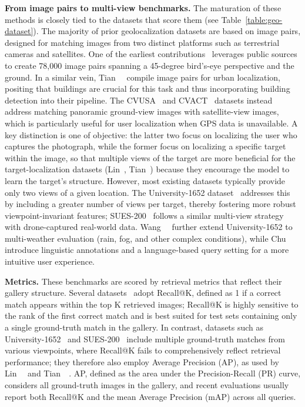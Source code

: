 \textbf{From image pairs to multi-view benchmarks.} The maturation of these methods is closely tied to the datasets that score them (see Table~\ref{table:geo-dataset}). The majority of prior geolocalization datasets are based on image pairs, designed for matching images from two distinct platforms such as terrestrial cameras and satellites. One of the earliest contributions~\cite{lin2015learning} leverages public sources to create 78,000 image pairs spanning a 45-degree bird's-eye perspective and the ground. In a similar vein, Tian~\etal~\cite{tian2017cross} compile image pairs for urban localization, positing that buildings are crucial for this task and thus incorporating building detection into their pipeline. The CVUSA~\cite{zhai2017predicting} and CVACT~\cite{liu2019lending} datasets instead address matching panoramic ground-view images with satellite-view images, which is particularly useful for user localization when GPS data is unavailable. A key distinction is one of objective: the latter two focus on localizing the user who captures the photograph, while the former focus on localizing a specific target within the image, so that multiple views of the target are more beneficial for the target-localization datasets (Lin~\etal, Tian~\etal) because they encourage the model to learn the target's structure. However, most existing datasets typically provide only two views of a given location. The University-1652 dataset~\cite{zheng2020university} addresses this by including a greater number of views per target, thereby fostering more robust viewpoint-invariant features; SUES-200~\cite{zhu2023sues} follows a similar multi-view strategy with drone-captured real-world data. Wang~\etal~\cite{wang2024multiple} further extend University-1652 to multi-weather evaluation (rain, fog, and other complex conditions), while Chu~\etal~\cite{chu2024towards} introduce linguistic annotations and a language-based query setting for a more intuitive user experience.

\textbf{Metrics.} These benchmarks are scored by retrieval metrics that reflect their gallery structure. Several datasets~\cite{liu2019lending,zhai2017predicting,vo2016localizing} adopt Recall@K, defined as 1 if a correct match appears within the top K retrieved images; Recall@K is highly sensitive to the rank of the first correct match and is best suited for test sets containing only a single ground-truth match in the gallery. In contrast, datasets such as University-1652~\cite{zheng2020university} and SUES-200~\cite{zhu2023sues} include multiple ground-truth matches from various viewpoints, where Recall@K fails to comprehensively reflect retrieval performance; they therefore also employ Average Precision (AP), as used by Lin~\etal~\cite{lin2015learning} and Tian~\etal~\cite{tian2017cross}. AP, defined as the area under the Precision-Recall (PR) curve, considers all ground-truth images in the gallery, and recent evaluations usually report both Recall@K and the mean Average Precision (mAP) across all queries.


